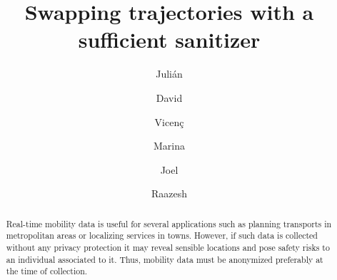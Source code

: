 \documentclass[times,twocolumn,final,authoryear]{elsarticle}
\begin{document}
\clearpage


\ifpreprint
  \setcounter{page}{1}
\else
  \setcounter{page}{1}
\fi

\begin{frontmatter}

\title{Swapping trajectories with a sufficient sanitizer}


\author[1,2]{Juli\'an } 

\author[1,2]{David }
\author[3,4]{Vicen\c{c}  }
\author[5]{Marina  }
\author[6]{Joel  }
\author[6,7]{Raazesh  }

\address[1]{Internet Interdisciplinary Institute (IN3), Universitat Oberta de Catalunya (UOC), Barcelona, Spain.
}
\address[2]{CYBERCAT-Center for Cybersecurity Research 
of Catalonia, Barcelona, Spain.}
\address[3]{Hamilton Institute, Maynooth University, Maynooth, Ireland.}
\address[4]{School of Informatics, University of Sk\"{o}vde, Sk\"{o}vde, Sweden.}
\address[5]{Department of Economic and Cultural Geography, Uppsala University, Uppsala, Sweden.}
\address[6]{Department of Mathematics, Uppsala University, Uppsala, Sweden.}
\address[7]{Combient Competence Centre for Data Engineering Sciences, Uppsala University, Sweden.}

\begin{abstract}



Real-time mobility data is useful for several applications such as planning transports in metropolitan areas or localizing services in towns. However, if such data is collected without any privacy protection it may reveal sensible locations and pose safety risks to an individual associated to it.
Thus, mobility data must be anonymized preferably at the time of collection.


\end{abstract}
\end{frontmatter}
\end{document}
